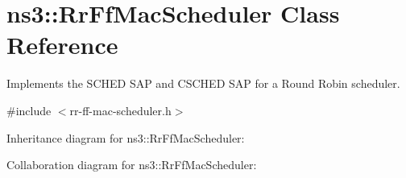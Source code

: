 \hypertarget{classns3_1_1RrFfMacScheduler}{}\section{ns3\+:\+:Rr\+Ff\+Mac\+Scheduler Class Reference}
\label{classns3_1_1RrFfMacScheduler}


Implements the S\+C\+H\+ED S\+AP and C\+S\+C\+H\+ED S\+AP for a Round Robin scheduler.  




{\ttfamily \#include $<$rr-\/ff-\/mac-\/scheduler.\+h$>$}



Inheritance diagram for ns3\+:\+:Rr\+Ff\+Mac\+Scheduler\+:


Collaboration diagram for ns3\+:\+:Rr\+Ff\+Mac\+Scheduler\+:
